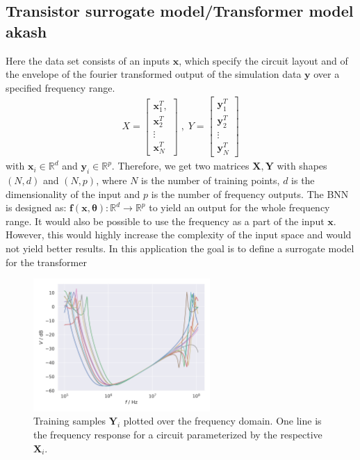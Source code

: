 \documentclass{article}
\begin{document}
\subsection{Transistor surrogate model/Transformer model akash}
Here the data set consists of an inputs $ \bm x$, which specify the circuit layout and of the envelope of the fourier transformed output of the simulation data $\bm y$ over a specified frequency range.
\begin{align}
    X = \begin{bmatrix}
        \bm x_1^T, \\
        \bm x_2^T\\
        \vdots\\
        \bm x_N^T
        \end{bmatrix} \;, \;
    Y = \begin{bmatrix}
        \bm y_1^T\\
        \bm y_2^T\\
        \vdots\\
        \bm y_N^T
    \end{bmatrix}
\end{align}
with $\bm x_i \in \mathbb{R}^d$ and $\bm y_i \in \mathbb{R}^{p}$. Therefore, we get two matrices $\bm X, \bm Y$ with shapes $(N, d)$ and $(N, p)$, where $N$ is the number of training points, $d$ is the dimensionality of the input and $p$ is the number of frequency outputs. The BNN is designed as: $\bm f(\bm x, \bm \theta): \mathbb{R}^d \rightarrow \mathbb{R}^p$ to yield an output for the whole frequency range. It would also be possible to use the frequency as a part of the input $\bm x$. However, this would highly increase the complexity of the input space and would not yield better results. In this application the goal is to define a surrogate model for the transformer
\begin{figure}[htbp!]
    \centering
    \includegraphics[width=0.6\textwidth]{plots/data_samples.png}
    \caption{Training samples $\bm Y_i$ plotted over the frequency domain. One line is the frequency response for a circuit parameterized by the respective $\bm X_i$.}
    \label{fig:training_samples}
\end{figure}
\end{document}

